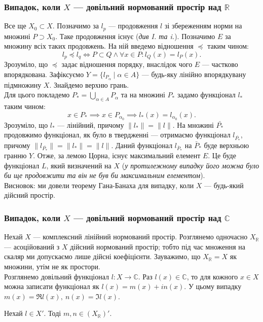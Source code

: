 \documentclass{math_library}
\begin{document}
\subsubsection{Випадок, коли $X$ --- довільний нормований простір над $\mathbb{R}$}
Все ще $X_0 \subset X$. Позначимо за $l_p$ --- продовження $l$  зі збереженням норми на множині $P \supset X_0$. Таке продовження існує (\textit{див I. та i.}). Позначимо $E$ за множину всіх таких продовжень. На ній введемо відношення $\preceq$ таким чином:
\[
l_p \preceq l_q \iff P \subset Q \wedge \forall x \in P: l_Q(x) = l_P(x).
\]
Зрозуміло, що $\preceq$ задає відношення порядку, внаслідок чого $E$ --- частково впорядкована. Зафіксуємо $Y = \{l_{P_\alpha} \mid \alpha \in A\}$ --- будь-яку лінійно впорядкувану підмножину $X$. Знайдемо верхню грань.\\
Для цього покладемо $P_* = \displaystyle\bigcup_{\alpha \in A} P_\alpha$ та на множині $P_*$ задамо функціонал $l_*$ таким чином:\[
x \in P_* \implies x \in P_{\alpha_0} \implies l_*(x) = l_{\alpha_0}(x).
\]
Зрозуміло, що $l_*$ --- лінійний, причому $\|l_*\| = \|l\|$. На множині $\bar{P_*}$ продовжимо функціонал, як було в твердженні --- отримаємо функціонал $l_{\bar{P_*}}$, причому $\|l_{\bar{P_*}}\| = \|l_*\| = \|l\|$. Даний функціонал $l_{\bar{P}_*}$ на $\bar{P}_*$ буде верхньою гранню $Y$. Отже, за лемою Цорна, існує максимальний елемент $E$. Це буде функціонал $L$, який визначений на $X$ (\textit{у протилежному випадку його можна було би ще продовжити та він не був би максимальним елементом}).
\bigskip \\
Висновок: ми довели теорему Гана-Банаха для випадку, коли $X$ --- будь-який дійсний простір.

\subsubsection{Випадок, коли $X$ --- довільний нормований простір над $\mathbb{C}$}
Нехай $X$ --- комплексний лінійний нормований простір. Розглянемо одночасно $X_{\mathbb{R}}$ --- асоційований з $X$ дійсний нормований простір; тобто під час множення на скаляр ми допускаємо лише дійсні коефіцієнти. Зауважимо, що $X_{\mathbb{R}} = X$ як множини, утім не як простори.\\
Розглянемо довільний функціонал $l \colon X \to \mathbb{C}$. Раз $l(x) \in \mathbb{C}$, то для кожного $x \in X$ можна записати функціонал як $l(x) = m(x) + i n(x)$. У цьому випадку $m(x) = \Re l(x),\ n(x) = \Im l(x)$.

\begin{proposition}
Нехай $l \in X'$. Тоді $m,n \in (X_{\mathbb{R}})'$.
\end{proposition}
\end{document}
